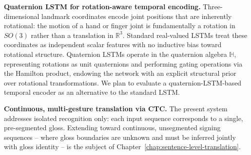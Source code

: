 \textbf{Quaternion LSTM for rotation-aware temporal encoding.} Three-dimensional
landmark coordinates encode joint positions that are inherently rotational: the
motion of a hand or finger joint is fundamentally a rotation in $SO(3)$ rather
than a translation in $\mathbb{R}^3$. Standard real-valued LSTMs treat these
coordinates as independent scalar features with no inductive bias toward
rotational structure. Quaternion LSTMs operate in the quaternion algebra
$\mathbb{H}$, representing rotations as unit quaternions and performing gating
operations via the Hamilton product, endowing the network with an explicit
structural prior over rotational transformations. We plan to evaluate a
quaternion-LSTM-based temporal encoder as an alternative to the standard LSTM.

\textbf{Continuous, multi-gesture translation via CTC.} The present system
addresses isolated recognition only: each input sequence corresponds to a
single, pre-segmented gloss. Extending toward continuous, unsegmented signing
sequences -- where gloss boundaries are unknown and must be inferred jointly
with gloss identity -- is the subject of
Chapter~\ref{chap:sentence-level-translation}.
